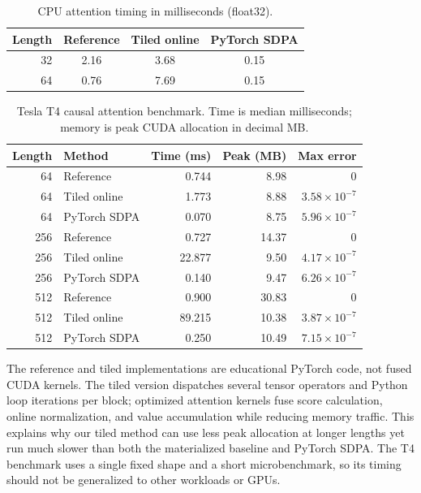 \documentclass[conference]{IEEEtran}
\begin{document}
\begin{table}[t]
\centering
\caption{CPU attention timing in milliseconds (float32).}
\label{tab:attention-cpu}
\begin{tabular}{rccc}
\hline
Length & Reference & Tiled online & PyTorch SDPA \\
\hline
32 & 2.16 & 3.68 & 0.15 \\
64 & 0.76 & 7.69 & 0.15 \\
\hline
\end{tabular}
\end{table}

\begin{table}[t]
\centering
\caption{Tesla T4 causal attention benchmark. Time is median milliseconds; memory is peak CUDA allocation in decimal MB.}
\label{tab:attention-t4}
\begin{tabular}{r l r r r}
\hline
Length & Method & Time (ms) & Peak (MB) & Max error \\
\hline
64 & Reference & 0.744 & 8.98 & 0 \\
64 & Tiled online & 1.773 & 8.88 & $3.58\times10^{-7}$ \\
64 & PyTorch SDPA & 0.070 & 8.75 & $5.96\times10^{-7}$ \\
256 & Reference & 0.727 & 14.37 & 0 \\
256 & Tiled online & 22.877 & 9.50 & $4.17\times10^{-7}$ \\
256 & PyTorch SDPA & 0.140 & 9.47 & $6.26\times10^{-7}$ \\
512 & Reference & 0.900 & 30.83 & 0 \\
512 & Tiled online & 89.215 & 10.38 & $3.87\times10^{-7}$ \\
512 & PyTorch SDPA & 0.250 & 10.49 & $7.15\times10^{-7}$ \\
\hline
\end{tabular}
\end{table}

The reference and tiled implementations are educational PyTorch code, not fused CUDA kernels. The tiled version dispatches several tensor operators and Python loop iterations per block; optimized attention kernels fuse score calculation, online normalization, and value accumulation while reducing memory traffic. This explains why our tiled method can use less peak allocation at longer lengths yet run much slower than both the materialized baseline and PyTorch SDPA. The T4 benchmark uses a single fixed shape and a short microbenchmark, so its timing should not be generalized to other workloads or GPUs.
\end{document}
